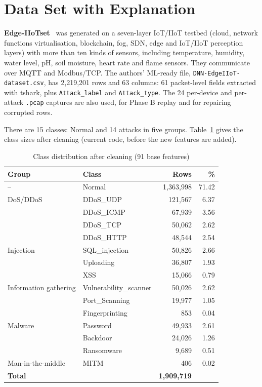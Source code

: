 \section{Data Set with Explanation}\label{sec:dataset}
\textbf{Edge-IIoTset}~\cite{ferrag2022edge} was generated on a seven-layer IoT/IIoT testbed (cloud, network functions virtualisation, blockchain, fog, SDN, edge and IoT/IIoT perception layers) with more than ten kinds of sensors, including temperature, humidity, water level, pH, soil moisture, heart rate and flame sensors. They communicate over MQTT and Modbus/TCP. The authors' ML-ready file, \texttt{DNN-EdgeIIoT-dataset.csv}, has 2{,}219{,}201 rows and 63 columns: 61 packet-level fields extracted with tshark, plus \texttt{Attack\_label} and \texttt{Attack\_type}. The 24 per-device and per-attack \texttt{.pcap} captures are also used, for Phase B replay and for repairing corrupted rows.

There are 15 classes: Normal and 14 attacks in five groups. Table~\ref{tab:classes} gives the class sizes after cleaning (current code, before the new features are added).

\begin{table}[H]
\centering
\renewcommand{\arraystretch}{1.15}
\begin{tabular}{|l|l|r|r|}
\hline
\textbf{Group} & \textbf{Class} & \textbf{Rows} & \textbf{\%} \\ \hline
-- & Normal & 1{,}363{,}998 & 71.42 \\ \hline
DoS/DDoS & DDoS\_UDP & 121{,}567 & 6.37 \\
 & DDoS\_ICMP & 67{,}939 & 3.56 \\
 & DDoS\_TCP & 50{,}062 & 2.62 \\
 & DDoS\_HTTP & 48{,}544 & 2.54 \\ \hline
Injection & SQL\_injection & 50{,}826 & 2.66 \\
 & Uploading & 36{,}807 & 1.93 \\
 & XSS & 15{,}066 & 0.79 \\ \hline
Information gathering & Vulnerability\_scanner & 50{,}026 & 2.62 \\
 & Port\_Scanning & 19{,}977 & 1.05 \\
 & Fingerprinting & 853 & 0.04 \\ \hline
Malware & Password & 49{,}933 & 2.61 \\
 & Backdoor & 24{,}026 & 1.26 \\
 & Ransomware & 9{,}689 & 0.51 \\ \hline
Man-in-the-middle & MITM & 406 & 0.02 \\ \hline
\multicolumn{2}{|l|}{\textbf{Total}} & \textbf{1{,}909{,}719} & \\ \hline
\end{tabular}
\caption{Class distribution after cleaning (91 base features)}
\label{tab:classes}
\end{table}

